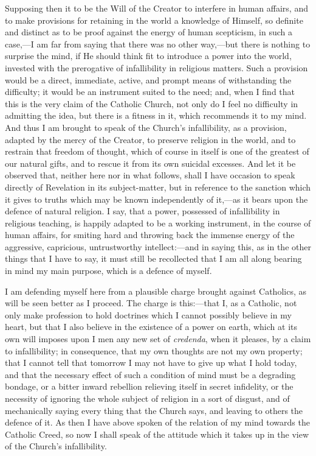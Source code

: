 Supposing then it to be the Will of the Creator to interfere in human
affairs, and to make provisions for retaining in the world a knowledge
of Himself, so definite and distinct as to be proof against the energy
of human scepticism, in such a case,—I am far from saying that there
was no other way,—but there is nothing to surprise the mind, if He
should think fit to introduce a power into the world, invested with the
prerogative of infallibility in religious matters. Such a provision
would be a direct, immediate, active, and prompt means of withstanding
the difficulty; it would be an instrument suited to the need; and, when
I find that this is the very claim of the Catholic Church, not only do I
feel no difficulty in admitting the idea, but there is a fitness in it,
which recommends it to my mind. And thus I am brought to speak of the
Church's infallibility, as a provision, adapted by the mercy of the
Creator, to preserve religion in the world, and to restrain that freedom
of thought, which of course in itself is one of the greatest of our
natural gifts, and to rescue it from its own suicidal excesses. And let
it be observed that, neither here nor in what follows, shall I have
occasion to speak directly of Revelation in its subject-matter, but in reference to the sanction which it gives to truths which
may be known independently of it,—as it bears upon the defence of natural religion. I say, that a power, possessed of
infallibility in religious teaching, is happily adapted to be a working
instrument, in the course of human affairs, for smiting hard and
throwing back the immense energy of the aggressive, capricious,
untrustworthy intellect:—and in saying this, as in the other things
that I have to say, it must still be recollected that I am all along
bearing in mind my main purpose, which is a defence of myself.

I am defending myself here from a plausible charge brought against
Catholics, as will be seen better as I proceed. The charge is this:—that
I, as a Catholic, not only make profession to hold doctrines which I
cannot possibly believe in my heart, but that I also believe in the
existence of a power on earth, which at its own will imposes upon I men
any new set of \emph{credenda}, when it pleases, by a claim to
infallibility; in consequence, that my own thoughts are not my own
property; that I cannot tell that tomorrow I may not have to give up
what I hold today, and that the necessary effect of such a condition of
mind must be a degrading bondage, or a bitter inward rebellion relieving
itself in secret infidelity, or the necessity of ignoring the whole
subject of religion in a sort of disgust, and of mechanically saying
every thing that the Church says, and leaving to others the defence of
it. As then I have above spoken of the relation of my mind towards the
Catholic Creed, so now I shall speak of the attitude which it takes up
in the view of the Church's infallibility.

